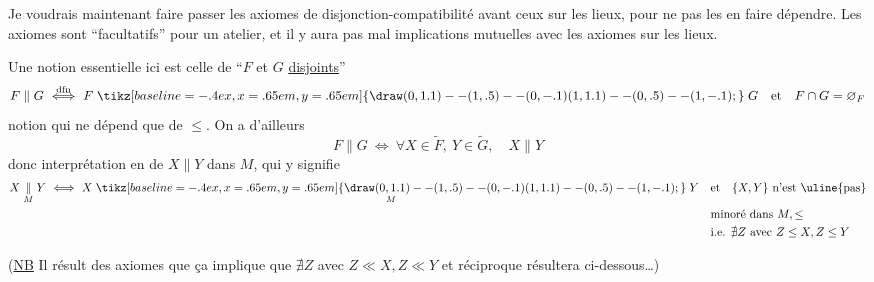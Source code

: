 \normalmarginpar

Je voudrais maintenant faire passer les axiomes de disjonction-compatibilité avant ceux sur les lieux, pour ne pas  les en faire dépendre. Les axiomes sont ``facultatifs'' pour un atelier, et il y aura pas mal  implications mutuelles avec les axiomes sur les lieux.

Une notion essentielle ici est celle de ``$F$ et $G$ \uline{disjoints}''
\[
 F\parallel G\ \overset{\mathrm{dfn}}{\Longleftrightarrow}\ F\mathrel{\tikz[baseline=-.4ex,x=.65em,y=.65em]{\draw (0,1.1)--(1,.5)--(0,-.1) (1,1.1)--(0,.5)--(1,-.1);}}G\quad\text{et}\quad F\cap G=\varnothing_F
\]
notion qui ne dépend que de $\leq$. On a d'ailleurs
\[
 F\parallel G\ \Longleftrightarrow\ \forall X\in\widetilde F,\ Y\in\widetilde G,\quad X\parallel Y
\]
donc interprétation en  de $X\parallel Y$ dans $M$, qui y signifie
\[
\begin{aligned}
X\mathrel{\underset{M}{\parallel}}Y\ \Longleftrightarrow\
 X\mathrel{\underset{M}{\mathrel{\tikz[baseline=-.4ex,x=.65em,y=.65em]{\draw (0,1.1)--(1,.5)--(0,-.1) (1,1.1)--(0,.5)--(1,-.1);}}}}Y\quad &\text{et}\quad\{X,Y\}\ \text{n'est \uline{pas}}\\
&\text{minoré dans } M,\leq\\
&\text{i.e. }\nexists Z\ \text{avec }Z\leq X,Z\leq Y
\end{aligned}
\]

(\uline{NB} Il résult\deleted{\unsure{era}}\inserted{\unsure{e|era}} des axiomes  que ça implique que $\nexists Z$ avec $Z\ll X,Z\ll Y$\unsure{)|,}  et  réciproque résultera  ci-dessous\ldots)

